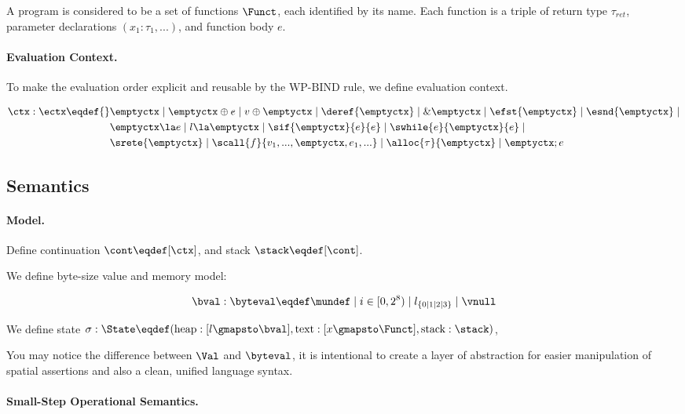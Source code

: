 A program is considered to be a set of functions $\Funct$, each identified by its name. Each
function is a triple of return type $\tau_{ret}$, parameter declarations $(x_1 : \tau_1, ...)$,
and function body $e$.

\paragraph{Evaluation Context.}

To make the evaluation order explicit and reusable by the $\text{WP-BIND}$ rule, we define evaluation context.

\begin{align*}
    \ctx : \ectx \eqdef{}&
        \emptyctx \mid \emptyctx \oplus e \mid v \oplus \emptyctx \mid
        \deref{\emptyctx} \mid \& \emptyctx \mid
        \efst{\emptyctx} \mid \esnd{\emptyctx} \mid \\&
        \emptyctx \la e \mid l \la \emptyctx \mid \sif{\emptyctx}{e}{e} \mid \swhile{e}{\emptyctx}{e} \mid \\&
        \srete{\emptyctx} \mid \scall{f}{v_1, ..., \emptyctx, e_1, ...} \mid \alloc{\tau}{\emptyctx} \mid \emptyctx ; e
\end{align*}

\subsection{Semantics}
\paragraph{Model.}

Define continuation $\cont \eqdef [\ctx]$, and stack $\stack \eqdef [\cont]$.

We define byte-size value and memory model:

\[\bval : \byteval \eqdef \mundef \mid i \in [0, 2^8) \mid l_{\{0 \mid 1 \mid 2 \mid 3\}} \mid \vnull\]

We define state $\sigma: \State \eqdef (\text{heap}: [ l \gmapsto \bval ], \text{text}: [x \gmapsto \Funct], \text{stack}: \stack)$,

You may notice the difference between $\Val$ and $\byteval$, it is intentional to create a layer of abstraction for
easier manipulation of spatial assertions and also a clean, unified language syntax.

\paragraph{Small-Step Operational Semantics.}

